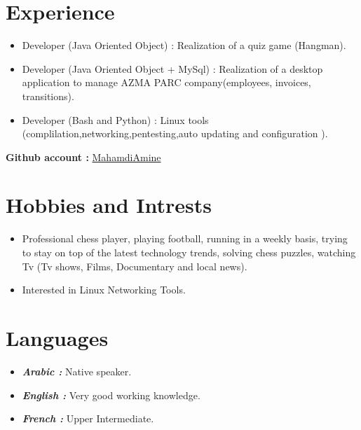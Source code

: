 \documentclass[12pt,a4paper,sans]{moderncv}
\begin{document}
	\section{Experience}
	\vspace{3ex}
	\begin{itemize}
		
		\item{Developer (Java Oriented Object) : Realization of a quiz game (Hangman).}
		\vspace{1ex}
		\item{Developer (Java Oriented Object + MySql) : Realization of a desktop application to manage AZMA PARC company(employees, invoices, transitions).}
		\vspace{1ex}
		\item{Developer (Bash and Python)   : Linux tools (complilation,networking,pentesting,auto updating and configuration ). }
		\vspace{1ex}
	\end{itemize}
	
	\textbf{Github account :}  \href{https://github.com/MahamdiAmine}{MahamdiAmine}
	\section{Hobbies and Intrests}
	\vspace{3ex}
	\begin{itemize}
		
		\item{Professional chess player, playing football, running in a weekly basis,  trying to stay on top of the latest technology trends, solving chess puzzles, watching Tv (Tv shows, Films, Documentary and local news).}
		\vspace{3ex}
		\item {Interested in Linux Networking Tools.}
		
	\end{itemize}
	
	\section{Languages}
	\vspace{3ex}	
	\begin{itemize}
		
		\item{\textbf{\emph{ Arabic : }} Native speaker.				}
		\vspace{1ex}
		\item{\textbf{\emph{English : }} Very good working knowledge.	}
		\vspace{1ex}
		\item{\textbf{\emph{French  : }} Upper Intermediate.			}
		\vspace{1ex}
	\end{itemize}
	
	
\end{document}
